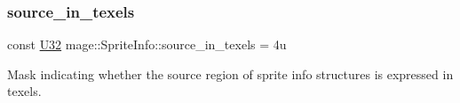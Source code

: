 \subsubsection{\texorpdfstring{source\+\_\+in\+\_\+texels}{source\_in\_texels}}
{\footnotesize\ttfamily const \hyperlink{namespacemage_a41c104c036fba3756a74e19f793eeaa1}{U32} mage\+::\+Sprite\+Info\+::source\+\_\+in\+\_\+texels = 4u\hspace{0.3cm}{\ttfamily [static]}}

Mask indicating whether the source region of sprite info structures is expressed in texels. 